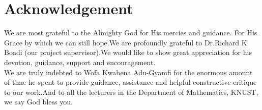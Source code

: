 \chapter*{Acknowledgement}

We are most grateful to the Almighty God for His mercies and guidance. For His Grace by which we can still hope.We are profoundly grateful to Dr.Richard K. Boadi (our project supervisor).We would like to show great appreciation for his devotion, guidance, support and encouragement.\\
We are truly indebted to Wofa Kwabena Adu-Gyamfi for the enormous amount of time he spent to provide guidance, assistance and helpful constructive critique to our work.And to all the lecturers in the Department of Mathematics, KNUST, we say God bless you.

